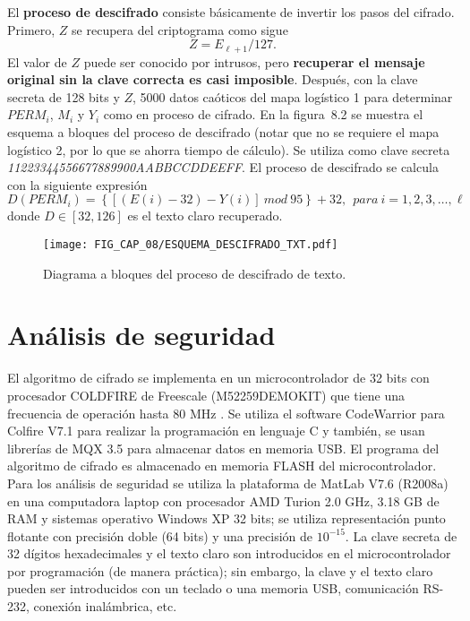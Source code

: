 El \textbf{proceso de descifrado} consiste básicamente de invertir los pasos del cifrado. Primero, $Z$ se recupera del criptograma como sigue
\begin{equation}
Z=E_{\ell +1}/127.
\end{equation}
El valor de $Z$ puede ser conocido por intrusos, pero \textbf{recuperar el mensaje original sin la clave correcta es casi imposible}. Después, con la clave secreta de 128 bits y $Z$, 5000 datos caóticos del mapa logístico 1 para determinar $PERM_{i}$, $M_{i}$ y $Y_{i}$ como en proceso de cifrado. En la figura~8.2 se muestra el esquema a bloques del proceso de descifrado (notar que no se requiere el mapa logístico 2, por lo que se ahorra tiempo de cálculo). Se utiliza como clave secreta \textit{11223344556677889900AABBCCDDEEFF}. El proceso de descifrado se calcula con la siguiente expresión  
\begin{equation}
D(PERM_{i})= \left\lbrace \left[ \left(E(i)-32\right)-Y(i) \right] ~mod~95 \right\rbrace +32, ~~ para ~i=1,2,3,\ldots ,\ell
\end{equation} 
donde $D\in \left[32,126\right]$ es el texto claro recuperado.

\begin{figure}[!htbp] %
	\center
	\texttt{[image: FIG\_CAP\_08/ESQUEMA\_DESCIFRADO\_TXT.pdf]}     
	\caption{Diagrama a bloques del proceso de descifrado de texto.}
\end{figure}

\section{Análisis de seguridad}
El algoritmo de cifrado se implementa en un microcontrolador de 32 bits con procesador COLDFIRE de Freescale (M52259DEMOKIT) que tiene una frecuencia de operación hasta 80 MHz \cite{M52259_2009}. Se utiliza el software CodeWarrior para Colfire V7.1 para realizar la programación en lenguaje C y también, se usan librerías de MQX 3.5 para almacenar datos en memoria USB. El programa del algoritmo de cifrado es almacenado en memoria FLASH del microcontrolador. Para los análisis de seguridad se utiliza la plataforma de MatLab
V7.6 (R2008a) en una computadora laptop con procesador AMD Turion 2.0 GHz, 3.18 GB de RAM y sistemas operativo Windows XP 32 bits; se utiliza representación punto flotante con precisión doble (64 bits) y una precisión de $10^{-15}$. La clave secreta de 32 dígitos hexadecimales y el texto claro son introducidos en el microcontrolador por programación (de manera práctica); sin embargo, la clave y el texto claro pueden ser introducidos con un teclado o una memoria USB, comunicación RS-232, conexión inalámbrica, etc. \\

